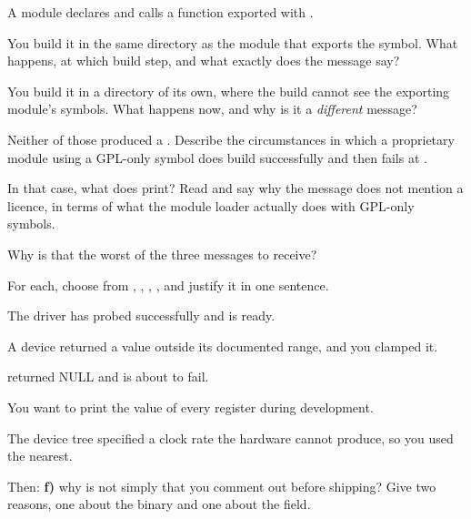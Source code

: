 A module declares  and calls a function exported with
.

 You build it in the same directory as the module that exports the symbol. What happens, at
which build step, and what exactly does the message say?

 You build it in a directory of its own, where the build cannot see the exporting module's
symbols. What happens now, and why is it a \emph{different} message?

 Neither of those produced a . Describe the circumstances in which a proprietary
module using a GPL-only symbol does build successfully and then fails at .

 In that case, what does  print? Read  and say why the
message does not mention a licence, in terms of what the module loader actually does with GPL-only
symbols.

 Why is that the worst of the three messages to receive?

\label{c4:ex:5}

For each, choose from , , , , and justify it
in one sentence.

 The driver has probed successfully and is ready.

 A device returned a value outside its documented range, and you clamped it.

  returned NULL and  is about to fail.

 You want to print the value of every register during development.

 The device tree specified a clock rate the hardware cannot produce, so you used the
nearest.

Then: \textbf{f)} why is  not simply  that you comment out before
shipping? Give two reasons, one about the binary and one about the field.

\label{c4:ex:6}

